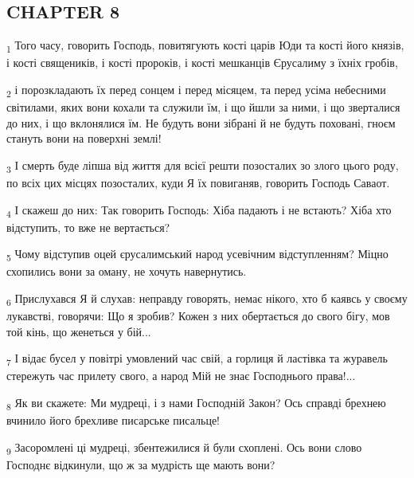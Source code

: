 \subsection{CHAPTER 8}
\begin{tcolorbox}
\textsubscript{1} Того часу, говорить Господь, повитягують кості царів Юди та кості його князів, і кості священиків, і кості пророків, і кості мешканців Єрусалиму з їхніх гробів,
\end{tcolorbox}
\begin{tcolorbox}
\textsubscript{2} і порозкладають їх перед сонцем і перед місяцем, та перед усіма небесними світилами, яких вони кохали та служили їм, і що йшли за ними, і що зверталися до них, і що вклонялися їм. Не будуть вони зібрані й не будуть поховані, гноєм стануть вони на поверхні землі!
\end{tcolorbox}
\begin{tcolorbox}
\textsubscript{3} І смерть буде ліпша від життя для всієї решти позосталих зо злого цього роду, по всіх цих місцях позосталих, куди Я їх повиганяв, говорить Господь Саваот.
\end{tcolorbox}
\begin{tcolorbox}
\textsubscript{4} І скажеш до них: Так говорить Господь: Хіба падають і не встають? Хіба хто відступить, то вже не вертається?
\end{tcolorbox}
\begin{tcolorbox}
\textsubscript{5} Чому відступив оцей єрусалимський народ усевічним відступленням? Міцно схопились вони за оману, не хочуть навернутись.
\end{tcolorbox}
\begin{tcolorbox}
\textsubscript{6} Прислухався Я й слухав: неправду говорять, немає нікого, хто б каявсь у своєму лукавстві, говорячи: Що я зробив? Кожен з них обертається до свого бігу, мов той кінь, що женеться у бій...
\end{tcolorbox}
\begin{tcolorbox}
\textsubscript{7} І відає бусел у повітрі умовлений час свій, а горлиця й ластівка та журавель стережуть час прилету свого, а народ Мій не знає Господнього права!...
\end{tcolorbox}
\begin{tcolorbox}
\textsubscript{8} Як ви скажете: Ми мудреці, і з нами Господній Закон? Ось справді брехнею вчинило його брехливе писарське писальце!
\end{tcolorbox}
\begin{tcolorbox}
\textsubscript{9} Засоромлені ці мудреці, збентежилися й були схоплені. Ось вони слово Господнє відкинули, що ж за мудрість ще мають вони?
\end{tcolorbox}

